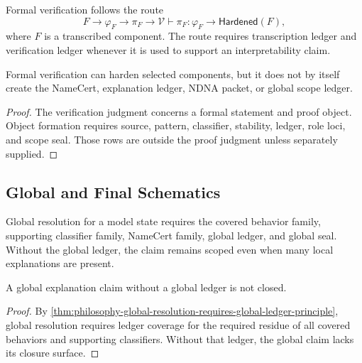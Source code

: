 \begin{definition}
\label{def:philosophy-verification-schematic}
Formal verification follows the route
$$
F
\longrightarrow
\varphi_F
\longrightarrow
\pi_F
\longrightarrow
\mathcal V\vdash\pi_F:\varphi_F
\longrightarrow
\mathsf{Hardened}(F),
$$
where $F$ is a transcribed component. The route requires transcription
ledger and verification ledger whenever it is used to support an
interpretability claim.
\end{definition}

\begin{theorem}
\label{thm:philosophy-verification-hardens-not-forms-objects}
Formal verification can harden selected components, but it does not by
itself create the NameCert, explanation ledger, NDNA packet, or global
scope ledger.
\end{theorem}
\begin{proof}
The verification judgment concerns a formal statement and proof object.
Object formation requires source, pattern, classifier, stability,
ledger, role loci, and scope seal. Those rows are outside the proof
judgment unless separately supplied.
\end{proof}

\subsection{Global and Final Schematics}
\label{subsec:philosophy-global-final-schematics}

\begin{definition}
\label{def:philosophy-global-resolution-schematic}
Global resolution for a model state requires the covered behavior family,
supporting classifier family, NameCert family, global ledger, and global
seal. Without the global ledger, the claim remains scoped even when many
local explanations are present.
\end{definition}

\begin{theorem}
\label{thm:philosophy-no-global-ledger-no-global-explanation}
A global explanation claim without a global ledger is not closed.
\end{theorem}
\begin{proof}
By
\autoref{thm:philosophy-global-resolution-requires-global-ledger-principle},
global resolution requires ledger coverage for the required residue of
all covered behaviors and supporting classifiers. Without that ledger,
the global claim lacks its closure surface.
\end{proof}

